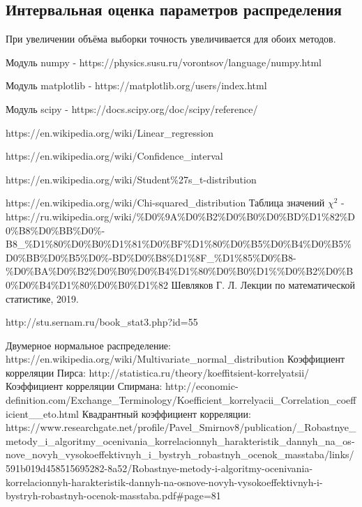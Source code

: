 \documentclass[a4]{article}
\begin{document}
\subsection{Интервальная оценка параметров распределения} %
\label{sub:интервальная_оценка_параметров_распределения}
При увеличении объёма выборки точность увеличивается для обоих методов.
\newpage
\begin{thebibliography}{}
      Модуль numpy  -  https://physics.susu.ru/vorontsov/language/numpy.html
    
    Модуль matplotlib - https://matplotlib.org/users/index.html
    
    Модуль scipy - https://docs.scipy.org/doc/scipy/reference/
    
    https://en.wikipedia.org/wiki/Linear\_regression

https://en.wikipedia.org/wiki/Confidence\_interval

https://en.wikipedia.org/wiki/Student\%27s\_t-distribution

https://en.wikipedia.org/wiki/Chi-squared\_distribution
Таблица значений $\chi^2$ -  https://ru.wikipedia.org/wiki/\%D0\%9A\%D0\%B2\%D0\%B0\%D0\%BD\%D1\%82\%D0\%B8\%D0\%BB\%D0\%\do-B8\_\%D1\%80\%D0\%B0\%D1\%81\%D0\%BF\%D1\%80\%D0\%B5\%D0\%B4\%D0\%B5\%D0\%BB\%D0\%B5\%D0\%\do-BD\%D0\%B8\%D1\%8F\_\%D1\%85\%D0\%B8-\%D0\%BA\%D0\%B2\%D0\%B0\%D0\%B4\%D1\%80\%D0\%B0\%D1\%\%D0\%B2\%D0\%B0\%D0\%B4\%D1\%80\%D0\%B0\%D1\%82
Шевляков Г. Л. Лекции по математической статистике, 2019.
    
    http://stu.sernam.ru/book\_stat3.php?id=55
    
Двумерное нормальное распределение: https://en.wikipedia.org/wiki/Multivariate\_normal\_distribution
Коэффициент корреляции Пирса: http://statistica.ru/theory/koeffitsient-korrelyatsii/ 
Коэффициент корреляции Спирмана: 
http://economic-definition.com/Exchange\_Terminology/Koefficient\_korrelyacii\_Correlation\_coefficient\_\_eto.html
 Квадрантный коэффициент корреляции: https://www.researchgate.net/profile/Pavel\_Smirnov8/publication/\_Robastnye\_metody\_i\_algoritmy\_ocenivania\_korrelacionnyh\_harakteristik\_dannyh\_na\_os\do-nove\_novyh\_vysokoeffektivnyh\_i\_bystryh\_robastnyh\_ocenok\_masstaba/links/591b019d458515695282\do-8a52/Robastnye-metody-i-algoritmy-ocenivania-korrelacionnyh-harakteristik-dannyh-na-osnove-novyh-vysokoeffektivnyh-i-bystryh-robastnyh-ocenok-masstaba.pdf\#page=81
\end{thebibliography}
\end{document}
